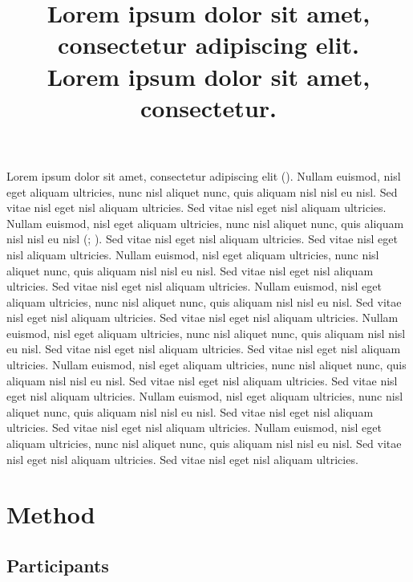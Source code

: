 \documentclass[
  jou,
  floatsintext,
  longtable,
  nolmodern,
  notxfonts,
  notimes,
  colorlinks=true,linkcolor=blue,citecolor=blue,urlcolor=blue]{apa7}
\title{\vskip 1cm
\bfseries Lorem ipsum dolor sit amet, consectetur adipiscing elit. \\ Lorem ipsum dolor sit amet, consectetur.}
\begin{document}
\maketitle


\setcounter{secnumdepth}{-\maxdimen} %

\setlength\LTleft{0pt}


Lorem ipsum dolor sit amet, consectetur adipiscing elit
(). Nullam euismod,
nisl eget aliquam ultricies, nunc nisl aliquet nunc, quis aliquam nisl
nisl eu nisl. Sed vitae nisl eget nisl aliquam ultricies. Sed vitae nisl
eget nisl aliquam ultricies. Nullam euismod, nisl eget aliquam
ultricies, nunc nisl aliquet nunc, quis aliquam nisl nisl eu nisl
(; ). Sed
vitae nisl eget nisl aliquam ultricies. Sed vitae nisl eget nisl aliquam
ultricies. Nullam euismod, nisl eget aliquam ultricies, nunc nisl
aliquet nunc, quis aliquam nisl nisl eu nisl. Sed vitae nisl eget nisl
aliquam ultricies. Sed vitae nisl eget nisl aliquam ultricies. Nullam
euismod, nisl eget aliquam ultricies, nunc nisl aliquet nunc, quis
aliquam nisl nisl eu nisl. Sed vitae nisl eget nisl aliquam ultricies.
Sed vitae nisl eget nisl aliquam ultricies. Nullam euismod, nisl eget
aliquam ultricies, nunc nisl aliquet nunc, quis aliquam nisl nisl eu
nisl. Sed vitae nisl eget nisl aliquam ultricies. Sed vitae nisl eget
nisl aliquam ultricies. Nullam euismod, nisl eget aliquam ultricies,
nunc nisl aliquet nunc, quis aliquam nisl nisl eu nisl. Sed vitae nisl
eget nisl aliquam ultricies. Sed vitae nisl eget nisl aliquam ultricies.
Nullam euismod, nisl eget aliquam ultricies, nunc nisl aliquet nunc,
quis aliquam nisl nisl eu nisl. Sed vitae nisl eget nisl aliquam
ultricies. Sed vitae nisl eget nisl aliquam ultricies. Nullam euismod,
nisl eget aliquam ultricies, nunc nisl aliquet nunc, quis aliquam nisl
nisl eu nisl. Sed vitae nisl eget nisl aliquam ultricies. Sed vitae nisl
eget nisl aliquam ultricies.

\section{Method}\label{method}

\subsection{Participants}\label{participants}
\end{document}
